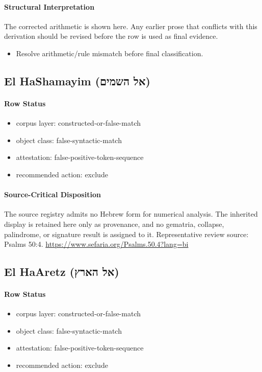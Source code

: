 \paragraph{Structural Interpretation}
The corrected arithmetic is shown here. Any earlier prose that conflicts with this derivation should be revised before the row is used as final evidence.

\begin{itemize}
\item Resolve arithmetic/rule mismatch before final classification.
\end{itemize}

\subsection{El HaShamayim (אל השמים)}
\paragraph{Row Status}
\begin{itemize}
\item corpus layer: constructed-or-false-match
\item object class: false-syntactic-match
\item attestation: false-positive-token-sequence
\item recommended action: exclude
\end{itemize}
\paragraph{Source-Critical Disposition}
The source registry admits no Hebrew form for numerical analysis. The inherited display is retained here only as provenance, and no gematria, collapse, palindrome, or signature result is assigned to it.
Representative review source: Psalms 50:4.
\url{https://www.sefaria.org/Psalms.50.4?lang=bi}

\subsection{El HaAretz (אל הארץ)}
\paragraph{Row Status}
\begin{itemize}
\item corpus layer: constructed-or-false-match
\item object class: false-syntactic-match
\item attestation: false-positive-token-sequence
\item recommended action: exclude
\end{itemize}
